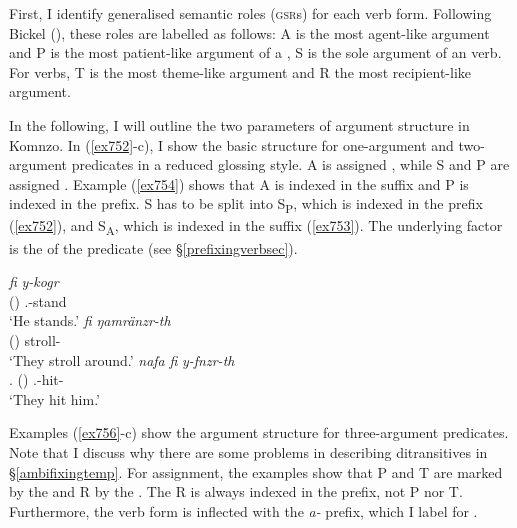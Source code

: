 First, I identify generalised semantic roles (\textsc{gsr}s) for each verb form. Following Bickel (\citeyear{Bickel:2011wo}), these roles are labelled as follows: A is the most agent-like argument and P is the most patient-like argument of a  , S is the sole argument of an  verb. For  verbs, T is the most theme-like argument and R the most recipient-like argument.%

In the following, I will outline the two parameters of argument structure in Komnzo. In (\ref{ex752}-c), I show the basic structure for one-argument and two-argument predicates in a reduced glossing style. A is assigned  , while S and P are assigned  . Example (\ref{ex754}) shows that A is indexed in the suffix and P is indexed in the prefix. S has to be split into S\textsubscript{P}, which is indexed in the prefix (\ref{ex752}), and S\textsubscript{A}, which is indexed in the suffix (\ref{ex753}). The underlying factor is the  of the predicate (see \S\ref{prefixingverbsec}).

\begin{exe}
\ex
\label{ex751}
\begin{xlist}
	\ex %
	\gll \emph{fi} \emph{y-kogr}\\
	\Third(\Abs) \Tsg.\Masc-stand\\
	\trans `He stands.'
	\label{ex752}
	\ex %
	\gll \emph{fi} \emph{ŋamränzr-th}\\
	\Third(\Abs) stroll-\Tpl\\
	\trans `They stroll around.'
	\label{ex753}
	\ex %
	\gll \emph{nafa} \emph{fi} \emph{y-fnzr-th}\\
	\Tpl{}.\Erg{} \Third(\Abs) \Tsg.\Masc-hit-\Tpl{}\\
	\trans `They hit him.'
	\label{ex754}
\end{xlist}
\end{exe}

Examples (\ref{ex756}-c) show the argument structure for three-argument predicates. Note that I discuss why there are some problems in describing ditransitives in \S\ref{ambifixingtemp}. For  assignment, the examples show that P and T are marked by the   and R by the  . The R is always indexed in the prefix, not P nor T. Furthermore, the verb form is inflected with the \emph{a-} prefix, which I label \Vc{} for .

